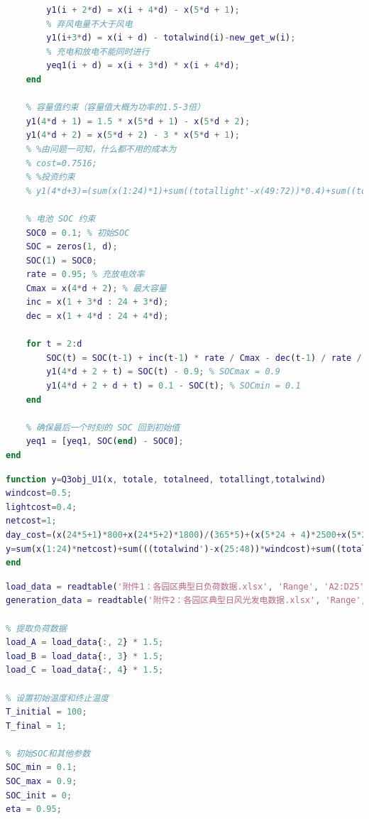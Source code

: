 \documentclass{cumcmthesis}
\begin{document}
\begin{appendices}
\begin{lstlisting}[language=Matlab]
        % 放电功率不超过最大放电功率
        y1(i + 2*d) = x(i + 4*d) - x(5*d + 1);
        % 弃风电量不大于风电
        y1(i+3*d) = x(i + d) - totalwind(i)-new_get_w(i);
        % 充电和放电不能同时进行
        yeq1(i + d) = x(i + 3*d) * x(i + 4*d);
    end
    
    % 容量值约束（容量值大概为功率的1.5-3倍）
    y1(4*d + 1) = 1.5 * x(5*d + 1) - x(5*d + 2);
    y1(4*d + 2) = x(5*d + 2) - 3 * x(5*d + 1);
    % %由问题一可知，什么都不用的成本为
    % cost=0.7516;
    % %投资约束
    % y1(4*d+3)=(sum(x(1:24)*1)+sum((totallight'-x(49:72))*0.4)+sum((totalwind'-x(25:48))*0.4)+(x(5*d + 1)*800+x(5*d + 2)*1800+x(5*d + 4)*2500+x(5*d + 3)*3000)/(365*5))/(sum(totalneed(:)))-cost;

    % 电池 SOC 约束
    SOC0 = 0.1; % 初始SOC
    SOC = zeros(1, d);
    SOC(1) = SOC0;
    rate = 0.95; % 充放电效率
    Cmax = x(4*d + 2); % 最大容量
    inc = x(1 + 3*d : 24 + 3*d);
    dec = x(1 + 4*d : 24 + 4*d);
    
    for t = 2:d
        SOC(t) = SOC(t-1) + inc(t-1) * rate / Cmax - dec(t-1) / rate / Cmax;
        y1(4*d + 2 + t) = SOC(t) - 0.9; % SOCmax = 0.9
        y1(4*d + 2 + d + t) = 0.1 - SOC(t); % SOCmin = 0.1
    end
    
    % 确保最后一个时刻的 SOC 回到初始值
    yeq1 = [yeq1, SOC(end) - SOC0];
end
\end{lstlisting}

	
\begin{lstlisting}[language=Matlab]
function y=Q3obj_U1(x, totale, totalneed, totallingt,totalwind)
windcost=0.5;
lightcost=0.4;
netcost=1;
day_cost=(x(24*5+1)*800+x(24*5+2)*1800)/(365*5)+(x(5*24 + 4)*2500+x(5*24 + 3)*3000)/(365*5);
y=sum(x(1:24)*netcost)+sum(((totalwind')-x(25:48))*windcost)+sum((totallingt'-x(49:72))*lightcost)+day_cost;
end
\end{lstlisting}

	
\begin{lstlisting}[language=Matlab]
% 读取附件数据
load_data = readtable('附件1：各园区典型日负荷数据.xlsx', 'Range', 'A2:D25');
generation_data = readtable('附件2：各园区典型日风光发电数据.xlsx', 'Range', 'A4:E27');

% 提取负荷数据
load_A = load_data{:, 2} * 1.5;
load_B = load_data{:, 3} * 1.5;
load_C = load_data{:, 4} * 1.5;

% 设置初始温度和终止温度
T_initial = 100;
T_final = 1;

% 初始SOC和其他参数
SOC_min = 0.1;
SOC_max = 0.9;
SOC_init = 0;
eta = 0.95;


\end{lstlisting}
\end{appendices}
\end{document}
